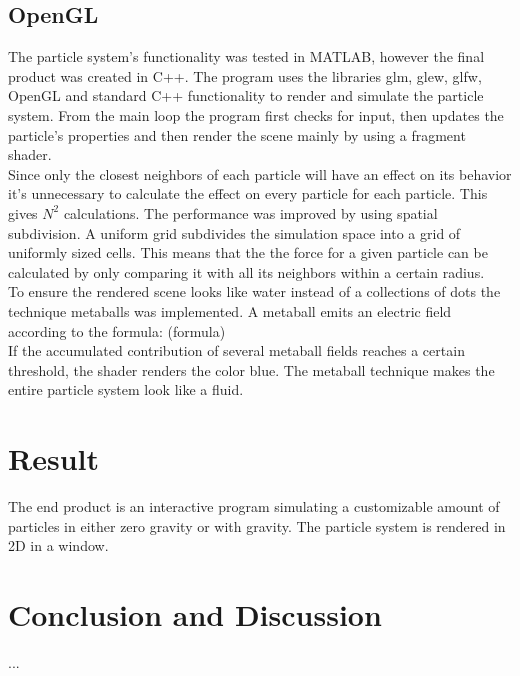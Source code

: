 \documentclass[a4paper,12pt,twoside]{report}
\begin{document}
\section{OpenGL}
The particle system’s functionality was tested in MATLAB, however the final product was created in C++. The program uses the libraries glm, glew, glfw, OpenGL and standard C++ functionality to render and simulate the particle system. From the main loop the program first checks for input, then updates the particle’s properties and then render the scene mainly by using a fragment shader. \\

\noindent Since only the closest neighbors of each particle will have an effect on its behavior it’s unnecessary to calculate the effect on every particle for each particle. This gives \(N^2\) calculations. The performance was improved by using spatial subdivision. A uniform grid subdivides the simulation space into a grid of uniformly sized cells. This means that the the force for a given particle can be calculated by only comparing it with all its neighbors within a certain radius. \\

\noindent To ensure the rendered scene looks like water instead of a collections of dots the technique metaballs was implemented. A metaball emits an electric field according to the formula: (formula) \\

\noindent  If the accumulated contribution of several metaball fields reaches a certain threshold, the shader renders the color blue. The metaball technique makes the entire particle system look like a fluid.

\chapter{Result}
The end product is an interactive program simulating a customizable amount of particles in either zero gravity or with gravity. The particle system is rendered in 2D in a window.


\chapter{Conclusion and Discussion}
...

\end{document}
